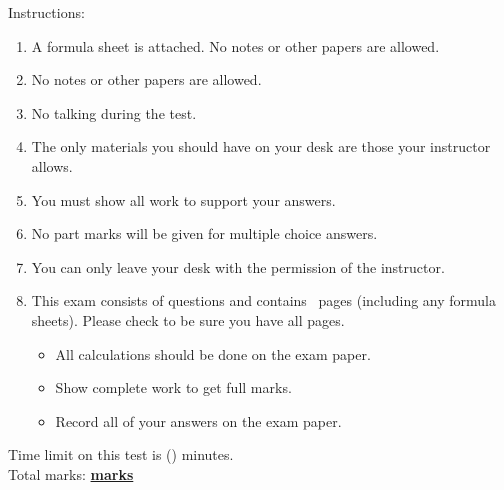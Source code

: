 {	Instructions:
	\begin{enumerate}[topsep=6pt,itemsep=6pt,label=\Alph*.]
	\ifdefined\FormulaSheet
		\item A formula sheet is attached. No notes or other papers are allowed.
	\else
		\item No notes or other papers are allowed.
	\fi
	\item No talking during the test.
	\item The only materials you should have on your desk are those your instructor allows.
	\item You must show all work to support your answers.
	\item No part marks will be given for multiple choice answers.
	\item You can only leave your desk with the permission of the instructor.
	\item This exam consists of \nQuesInExam[exam1] questions and contains \nPagesOnExam \ pages (including any formula sheets). Please check to be sure you have all pages.
		\begin{itemize}
		\item All calculations should be done on the exam paper.
		\item Show complete work to get full marks.
		\item Record all of your answers on the exam paper.
		\end{itemize}
	\end{enumerate}

	Time limit on this test is \numberstringnum{\TimeLimit} (\TimeLimit) minutes. \\

	Total marks: \textbf{\underline{\boldmath{} marks}}
	\sumryAnnots    
    \endgroup
}
\makeatletter